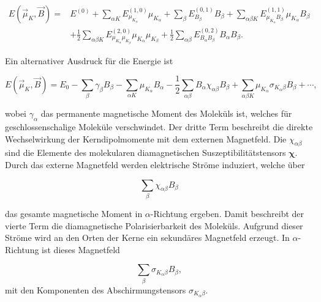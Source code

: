 \begin{equation}\label{eq:evonbmu0}
\begin{aligned}
E(\vec{\mu}_K,\vec{B})=&E^{(0)}+\sum_{\alpha K} E^{(1,0)}_{\mu_{K_\alpha}} \mu_{K_\alpha}+\sum_\beta E^{(0,1)}_{B_\beta} B_\beta+\sum_{\alpha\beta K} E^{(1,1)}_{\mu_{K_\alpha}B_\beta} \mu_{K_\alpha}B_\beta\\
&+\frac{1}{2}\sum_{\alpha\beta K} E^{(2,0)}_{\mu_{K_\alpha}\mu_{K_\beta}}\mu_{K_\alpha}\mu_{K_\beta}+\frac{1}{2}\sum_{\alpha\beta} E^{(0,2)}_{B_\alpha B_\beta}B_\alpha B_\beta.
\end{aligned}
\end{equation}

Ein alternativer Ausdruck für die Energie ist

\begin{equation}\label{eq:evonbmu}
 E(\vec{\mu}_K,\vec{B})=E_0-\sum_\beta \gamma_\beta B_\beta-\sum_{\alpha K}\mu_{K_\alpha}B_\alpha-\frac{1}{2}\sum_{\alpha\beta}B_\alpha\chi_{\alpha\beta} B_\beta+\sum_{\alpha\beta K}\mu_{K_\alpha}\sigma_{K_\alpha \beta}B_\beta+\cdots, 
\end{equation}

wobei $\gamma_\alpha$ das permanente magnetische Moment des Moleküls ist, welches für geschlossenschalige Moleküle verschwindet. Der dritte Term beschreibt die direkte Wechselwirkung der Kerndipolmomente mit dem externen Magnetfeld. Die $\chi_{\alpha\beta}$ sind die Elemente des molekularen diamagnetischen Suszeptibilitätstensors $\boldsymbol{\chi}$. Durch das externe Magnetfeld werden elektrische Ströme induziert, welche über 

\begin{equation}
\sum_{\beta}\chi_{\alpha\beta} B_\beta
\end{equation} 

das gesamte magnetische Moment in $\alpha$-Richtung ergeben. Damit beschreibt der vierte Term die diamagnetische Polarisierbarkeit des Moleküls. Aufgrund dieser Ströme wird an den Orten der Kerne ein sekundäres Magnetfeld erzeugt. In $\alpha$-Richtung ist dieses Magnetfeld

\begin{equation}\label{eq:sekbfeld}
\sum_{\beta}\sigma_{K_\alpha\beta} B_\beta,
\end{equation}
mit den Komponenten des Abschirmungstensors $\sigma_{K_\alpha\beta}$.

%

